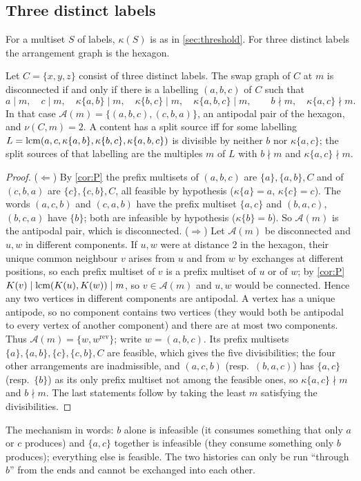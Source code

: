 \subsection{Three distinct labels}
For a multiset $S$ of labels, $\kappa(S)$ is as in \cref{sec:threshold}. For three distinct labels the arrangement graph is the hexagon.
\begin{theorem}\label{thm:T3}
Let $C=\{x,y,z\}$ consist of three distinct labels. The swap graph of $C$ at $m$ is disconnected if and only if there is a labelling $(a,b,c)$ of $C$ such that
\[
 a\mid m,\quad c\mid m,\quad \kappa\{a,b\}\mid m,\quad \kappa\{b,c\}\mid m,\quad \kappa\{a,b,c\}\mid m,\qquad b\nmid m,\quad \kappa\{a,c\}\nmid m .
\]
In that case $\mathcal A(m)=\{(a,b,c),(c,b,a)\}$, an antipodal pair of the hexagon, and $\nu(C,m)=2$. A content has a split source iff for some labelling $L=\operatorname{lcm}(a,c,\kappa\{a,b\},\kappa\{b,c\},\kappa\{a,b,c\})$ is divisible by neither $b$ nor $\kappa\{a,c\}$; the split sources of that labelling are the multiples $m$ of $L$ with $b\nmid m$ and $\kappa\{a,c\}\nmid m$.
\end{theorem}
\begin{proof}
($\Leftarrow$) By \cref{cor:P} the prefix multisets of $(a,b,c)$ are $\{a\},\{a,b\},C$ and of $(c,b,a)$ are $\{c\},\{c,b\},C$, all feasible by hypothesis ($\kappa\{a\}=a$, $\kappa\{c\}=c$). The words $(a,c,b)$ and $(c,a,b)$ have the prefix multiset $\{a,c\}$ and $(b,a,c)$, $(b,c,a)$ have $\{b\}$; both are infeasible by hypothesis ($\kappa\{b\}=b$). So $\mathcal A(m)$ is the antipodal pair, which is disconnected.
($\Rightarrow$) Let $\mathcal A(m)$ be disconnected and $u,w$ in different components. If $u,w$ were at distance $2$ in the hexagon, their unique common neighbour $v$ arises from $u$ and from $w$ by exchanges at different positions, so each prefix multiset of $v$ is a prefix multiset of $u$ or of $w$; by \cref{cor:P} $K(v)\mid\operatorname{lcm}(K(u),K(w))\mid m$, so $v\in\mathcal A(m)$ and $u,w$ would be connected. Hence any two vertices in different components are antipodal. A vertex has a unique antipode, so no component contains two vertices (they would both be antipodal to every vertex of another component) and there are at most two components. Thus $\mathcal A(m)=\{w,w^{\mathrm{rev}}\}$; write $w=(a,b,c)$. Its prefix multisets $\{a\},\{a,b\},\{c\},\{c,b\},C$ are feasible, which gives the five divisibilities; the four other arrangements are inadmissible, and $(a,c,b)$ (resp.\ $(b,a,c)$) has $\{a,c\}$ (resp.\ $\{b\}$) as its only prefix multiset not among the feasible ones, so $\kappa\{a,c\}\nmid m$ and $b\nmid m$. The last statements follow by taking the least $m$ satisfying the divisibilities.
\end{proof}
\begin{remark}
The mechanism in words: $b$ alone is infeasible (it consumes something that only $a$ or $c$ produces) and $\{a,c\}$ together is infeasible (they consume something only $b$ produces); everything else is feasible. The two histories can only be run ``through $b$'' from the ends and cannot be exchanged into each other.
\end{remark}

